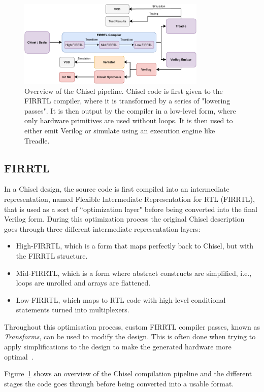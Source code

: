 \documentclass[conference]{IEEEtran}
\begin{document}
\begin{figure}[t]
    \centering
    \includegraphics[width=0.8\textwidth]{Chisel_FIRRTL_VERILOG.pdf}
    \caption{Overview of the Chisel pipeline. Chisel code is first given to the FIRRTL compiler, where it is transformed by a series of "lowering passes". It is then output by the compiler in a low-level form, where only hardware primitives are used without loops. It is then used to either emit Verilog or simulate using an execution engine like Treadle.}
\label{fig:chisel}
\end{figure}

\subsection{FIRRTL}
In a Chisel design, the source code is first compiled into an intermediate representation, named Flexible Intermediate Representation for RTL (FIRRTL), that is used as a sort of ``optimization layer" before being converted into the final Verilog form. During this optimization process the original Chisel description goes through three different intermediate representation layers:
\begin{itemize}
\item High-FIRRTL, which is a form that maps perfectly back to Chisel, but with the FIRRTL structure.
\item Mid-FIRRTL, which is a form where abstract constructs are simplified, i.e., loops are unrolled and arrays are flattened.
\item Low-FIRRTL, which maps to RTL code with high-level conditional statements turned into multiplexers.
\end{itemize}
Throughout this optimisation process, custom FIRRTL compiler passes, known as \textit{Transforms}, can be used to modify the design. This is often done when trying to apply simplifications to the design to make the generated hardware more optimal~\cite{firrtl}.  

Figure~\ref{fig:chisel} shows an overview of the Chisel compilation pipeline and the different stages the code goes through before being converted into a usable format.
\end{document}
